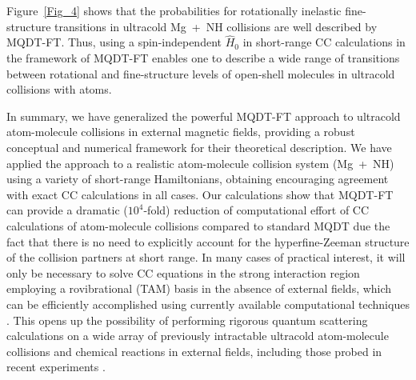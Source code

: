 \documentclass[reprint,amssymb,noeprint,twocolumn,longbibliography]{revtex4-2}
\begin{document}
Figure~\ref{Fig_4} shows that the probabilities for rotationally inelastic fine-structure transitions in ultracold Mg~+~NH collisions are well described by MQDT-FT. %
Thus, using a spin-independent $\hat{H}_0$ in short-range CC calculations in the framework of MQDT-FT enables one to describe a wide range of transitions between rotational and fine-structure levels of open-shell molecules in ultracold collisions with atoms.




In summary, we have generalized the powerful MQDT-FT approach to ultracold atom-molecule collisions in external magnetic fields, providing a robust conceptual and numerical framework for their theoretical description.
We have applied the approach to a realistic atom-molecule collision system (Mg~+~NH) using a variety of short-range Hamiltonians, obtaining encouraging agreement with exact CC calculations in all cases. 
Our calculations show that MQDT-FT can provide a dramatic ($10^4$-fold) reduction of computational effort of CC calculations of atom-molecule collisions compared to standard MQDT \cite{Croft_12} due the fact that there is no need to explicitly account for the hyperfine-Zeeman structure of the collision partners at short range. 
In many cases of practical interest, it will only be necessary to solve CC equations in the strong interaction region employing a rovibrational (TAM) basis in the absence of external fields,  which can be efficiently accomplished using currently available computational techniques \cite{ABC,Pack_87,Kendrick_18,Croft_17,Morita_23,Jisha_14}. This opens up the possibility of performing rigorous quantum scattering calculations on a wide array of previously intractable ultracold atom-molecule collisions and chemical reactions in external fields, including those probed in recent experiments \cite{Yang_19,Wang_21,Son_22,Park:23b,Nichols_22}.
\end{document}
